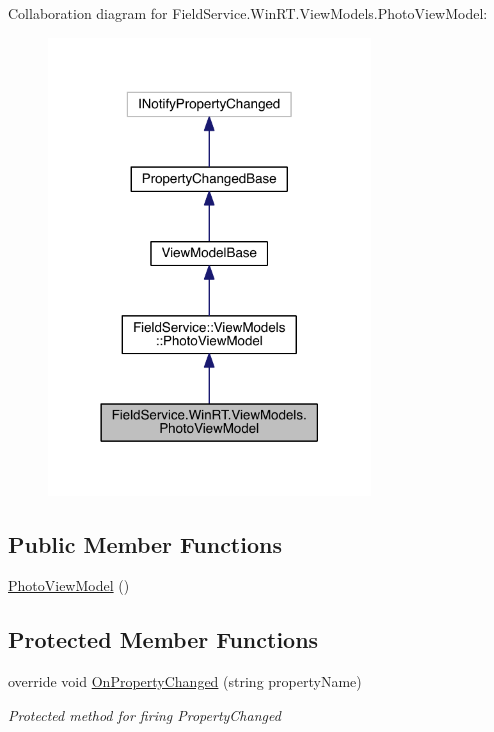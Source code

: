 Collaboration diagram for Field\+Service.\+Win\+R\+T.\+View\+Models.\+Photo\+View\+Model\+:
\nopagebreak
\begin{figure}[H]
\begin{center}
\leavevmode
\includegraphics[width=242pt]{class_field_service_1_1_win_r_t_1_1_view_models_1_1_photo_view_model__coll__graph}
\end{center}
\end{figure}
\subsection*{Public Member Functions}
\begin{DoxyCompactItemize}
\item 
\hyperlink{class_field_service_1_1_win_r_t_1_1_view_models_1_1_photo_view_model_a685e9a03210fc9e3e553bc0091bfe390}{Photo\+View\+Model} ()
\end{DoxyCompactItemize}
\subsection*{Protected Member Functions}
\begin{DoxyCompactItemize}
\item 
override void \hyperlink{class_field_service_1_1_win_r_t_1_1_view_models_1_1_photo_view_model_a44fe6751c9c968a39e93d5484f0e821c}{On\+Property\+Changed} (string property\+Name)
\begin{DoxyCompactList}\small\item\em Protected method for firing Property\+Changed \end{DoxyCompactList}\end{DoxyCompactItemize}
